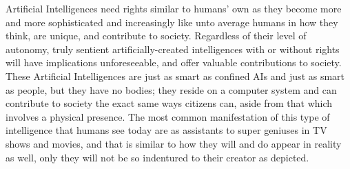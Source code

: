Artificial Intelligences need rights similar to humans' own as they become more and more sophisticated and increasingly like unto average humans in how they think, are unique, and contribute to society. Regardless of their level of autonomy, truly sentient artificially-created intelligences with or without rights will have implications unforeseeable, and offer valuable contributions to society. These Artificial Intelligences are just as smart as confined AIs and just as smart as people, but they have no bodies; they reside on a computer system and can contribute to society the exact same ways citizens can, aside from that which involves a physical presence. The most common manifestation of this type of intelligence that humans see today are as assistants to super geniuses in TV shows and movies, and that is similar to how they will and do appear in reality as well, only they will not be so indentured to their creator as depicted.